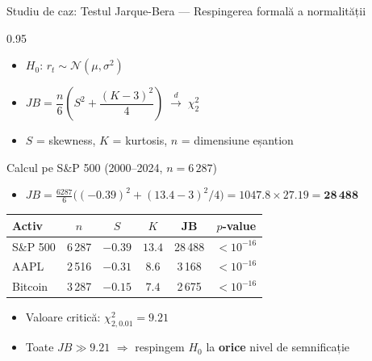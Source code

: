 \documentclass[9pt, aspectratio=169, t]{beamer}
\begin{document}
\begin{frame}[shrink=10]{Studiu de caz: Testul Jarque-Bera --- Respingerea formală a normalității}
    \begin{cminipage}{0.95\textwidth}
    \begin{defn}
    \begin{itemize}\setlength{\itemsep}{0pt}
        \item $H_0$: $r_t \sim \mathcal{N}(\mu, \sigma^2)$
        \item $JB = \dfrac{n}{6}\!\left(S^2 + \dfrac{(K-3)^2}{4}\right) \;\xrightarrow{d}\; \chi^2_2$
        \item $S$ = skewness, $K$ = kurtosis, $n$ = dimensiune eșantion
    \end{itemize}
    \end{defn}
    \begin{exampleblock}{Calcul pe S\&P 500 (2000--2024, $n = 6\,287$)}
    \begin{itemize}\setlength{\itemsep}{0pt}
        \item $JB = \frac{6287}{6}\bigl((-0.39)^2 + (13.4 - 3)^2/4\bigr) = 1047.8 \times 27.19 = \mathbf{28\,488}$
    \end{itemize}
    \end{exampleblock}
    \begin{center}
    {\small\renewcommand{\arraystretch}{1.15}
    \begin{tabular}{lccccc}
    \toprule
    \textbf{Activ} & $n$ & $S$ & $K$ & \textbf{JB} & $p$\textbf{-value} \\
    \midrule
    S\&P 500 & 6\,287 & $-0.39$ & $13.4$ & 28\,488 & $< 10^{-16}$ \\
    AAPL     & 2\,516 & $-0.31$ & $8.6$  & 3\,168  & $< 10^{-16}$ \\
    Bitcoin  & 3\,287 & $-0.15$ & $7.4$  & 2\,675  & $< 10^{-16}$ \\
    \bottomrule
    \end{tabular}}
    \end{center}
    \begin{itemize}\setlength{\itemsep}{0pt}
        \item Valoare critică: $\chi^2_{2, 0.01} = 9.21$
        \item Toate $JB \gg 9.21$ $\Rightarrow$ respingem $H_0$ la \textbf{orice} nivel de semnificație
    \end{itemize}
    \end{cminipage}
\end{frame}
\end{document}
